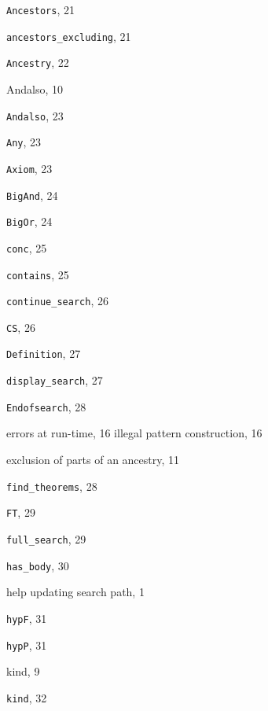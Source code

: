 \begin{theindex}

  \item {\tt  Ancestors}, 21
  \item {\tt  ancestors\_excluding}, 21
  \item {\tt  Ancestry}, 22
  \item {\ptt Andalso}, 10
  \item {\tt  Andalso}, 23
  \item {\tt  Any}, 23
  \item {\tt  Axiom}, 23

  \indexspace

  \item {\tt  BigAnd}, 24
  \item {\tt  BigOr}, 24

  \indexspace

  \item {\tt  conc}, 25
  \item {\tt  contains}, 25
  \item {\tt  continue\_search}, 26
  \item {\tt  CS}, 26

  \indexspace

  \item {\tt  Definition}, 27
  \item {\tt  display\_search}, 27

  \indexspace

  \item {\tt  Endofsearch}, 28
  \item errors
    \subitem at run-time, 16
    \subitem illegal pattern construction, 16
  \item exclusion
    \subitem of parts of an ancestry, 11

  \indexspace

  \item {\tt  find\_theorems}, 28
  \item {\tt  FT}, 29
  \item {\tt  full\_search}, 29

  \indexspace

  \item {\tt  has\_body}, 30
  \item help
    \subitem updating search path, 1
  \item {\tt  hypF}, 31
  \item {\tt  hypP}, 31

  \indexspace

  \item {\ptt kind}, 9
  \item {\tt  kind}, 32


\end{theindex}
